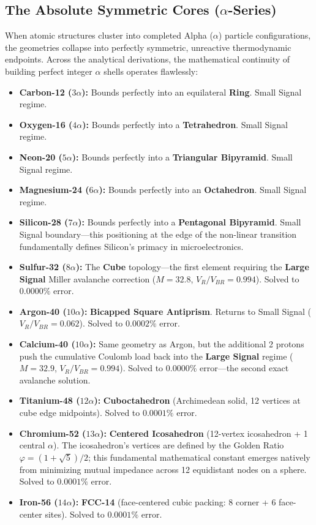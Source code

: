 \subsection{The Absolute Symmetric Cores ($\alpha$-Series)}
When atomic structures cluster into completed Alpha ($\alpha$) particle configurations, the geometries collapse into perfectly symmetric, unreactive thermodynamic endpoints. Across the analytical derivations, the mathematical continuity of building perfect integer $\alpha$ shells operates flawlessly:
\begin{itemize}
    \item \textbf{Carbon-12 ($3\alpha$):} Bounds perfectly into an equilateral \textbf{Ring}. Small Signal regime.
    \item \textbf{Oxygen-16 ($4\alpha$):} Bounds perfectly into a \textbf{Tetrahedron}. Small Signal regime.
    \item \textbf{Neon-20 ($5\alpha$):} Bounds perfectly into a \textbf{Triangular Bipyramid}. Small Signal regime.
    \item \textbf{Magnesium-24 ($6\alpha$):} Bounds perfectly into an \textbf{Octahedron}. Small Signal regime.
    \item \textbf{Silicon-28 ($7\alpha$):} Bounds perfectly into a \textbf{Pentagonal Bipyramid}. Small Signal boundary---this positioning at the edge of the non-linear transition fundamentally defines Silicon's primacy in microelectronics.
    \item \textbf{Sulfur-32 ($8\alpha$):} The \textbf{Cube} topology---the first element requiring the \textbf{Large Signal} Miller avalanche correction ($M = 32.8$, $V_R/V_{BR} = 0.994$). Solved to $0.0000\%$ error.
    \item \textbf{Argon-40 ($10\alpha$):} \textbf{Bicapped Square Antiprism}. Returns to Small Signal ($V_R/V_{BR} = 0.062$). Solved to $0.0002\%$ error.
    \item \textbf{Calcium-40 ($10\alpha$):} Same geometry as Argon, but the additional 2 protons push the cumulative Coulomb load back into the \textbf{Large Signal} regime ($M = 32.9$, $V_R/V_{BR} = 0.994$). Solved to $0.0000\%$ error---the second exact avalanche solution.
    \item \textbf{Titanium-48 ($12\alpha$):} \textbf{Cuboctahedron} (Archimedean solid, 12 vertices at cube edge midpoints). Solved to $0.0001\%$ error.
    \item \textbf{Chromium-52 ($13\alpha$):} \textbf{Centered Icosahedron} (12-vertex icosahedron + 1 central $\alpha$). The icosahedron's vertices are defined by the Golden Ratio $\varphi = (1+\sqrt{5})/2$; this fundamental mathematical constant emerges natively from minimizing mutual impedance across 12 equidistant nodes on a sphere. Solved to $0.0001\%$ error.
    \item \textbf{Iron-56 ($14\alpha$):} \textbf{FCC-14} (face-centered cubic packing: 8 corner + 6 face-center sites). Solved to $0.0001\%$ error.
\end{itemize}


